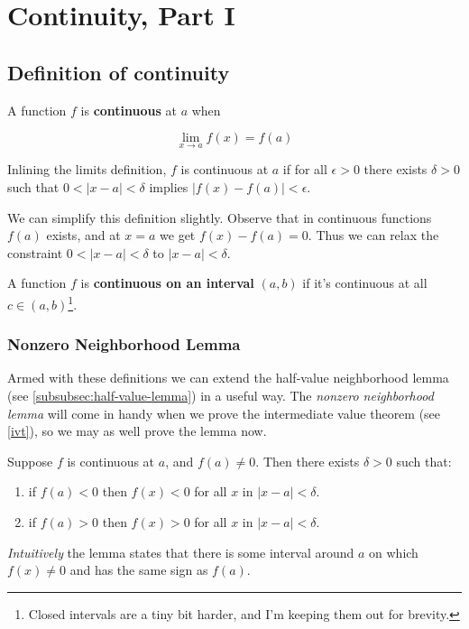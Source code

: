 \section{Continuity, Part I}

\subsection{Definition of continuity}

A function $f$ is \textbf{continuous} at $a$ when

\[\lim_{x\to a}f(x)=f(a)\]

Inlining the limits definition, $f$ is continuous at $a$ if for all
$\epsilon>0$ there exists $\delta>0$ such that $0<|x-a|<\delta$ implies
$|f(x)-f(a)|<\epsilon$.

\vs

We can simplify this definition slightly. Observe that in continuous
functions $f(a)$ exists, and at $x=a$ we get $f(x)-f(a)=0$. Thus we
can relax the constraint $0<|x-a|<\delta$ to $|x-a|<\delta$.

\vs

A function $f$ is \textbf{continuous on an interval} $(a, b)$ if it's
continuous at all $c\in(a,b)$\footnote{Closed intervals are a tiny bit
  harder, and I'm keeping them out for brevity.}.

\subsubsection*{Nonzero Neighborhood Lemma} \label{subsubsec:nonzero-lemma}

Armed with these definitions we can extend the half-value neighborhood
lemma (see \ref{subsubsec:half-value-lemma}) in a useful way. The
\textit{nonzero neighborhood lemma} will come in handy when we prove
the intermediate value theorem (see \ref{ivt}), so we may as well
prove the lemma now.

\vs

Suppose $f$ is continuous at $a$, and $f(a)\neq0$. Then there exists
$\delta>0$ such that:
\begin{enumerate}
\item if $f(a)<0$ then $f(x)<0$ for all $x$ in $|x-a|<\delta$.
\item if $f(a)>0$ then $f(x)>0$ for all $x$ in $|x-a|<\delta$.
\end{enumerate}

\textit{Intuitively} the lemma states that there is some interval
around $a$ on which $f(x)\neq0$ and has the same sign as $f(a)$.

